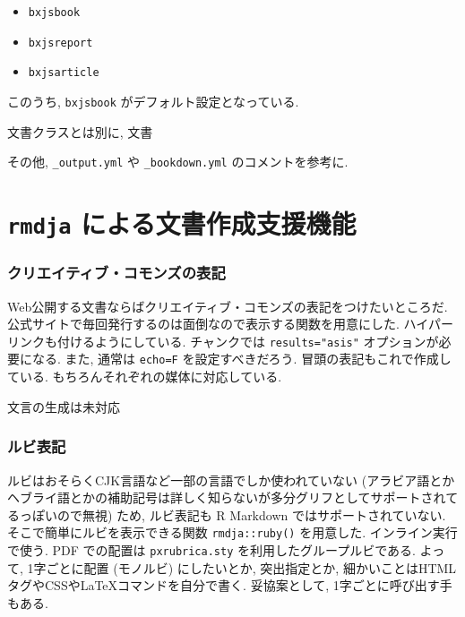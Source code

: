 \documentclass[
  nomag]{bxjsbook}
\providecommand{\tightlist}{%
  \setlength{\itemsep}{0pt}\setlength{\parskip}{0pt}}
\theoremstyle{definition}
\theoremstyle{definition}
\theoremstyle{definition}
\theoremstyle{remark}
\begin{document}
\begin{itemize}
\tightlist
\item
  \texttt{bxjsbook}
\item
  \texttt{bxjsreport}
\item
  \texttt{bxjsarticle}
\end{itemize}

このうち, \texttt{bxjsbook} がデフォルト設定となっている.

文書クラスとは別に, 文書

その他, \texttt{\_output.yml} や \texttt{\_bookdown.yml}
のコメントを参考に.

\hypertarget{rmdja-ux306bux3088ux308bux6587ux66f8ux4f5cux6210ux652fux63f4ux6a5fux80fd}{%
\chapter{\texorpdfstring{\texttt{rmdja}
による文書作成支援機能}{rmdja による文書作成支援機能}}\label{rmdja-ux306bux3088ux308bux6587ux66f8ux4f5cux6210ux652fux63f4ux6a5fux80fd}}

\hypertarget{ux30afux30eaux30a8ux30a4ux30c6ux30a3ux30d6ux30b3ux30e2ux30f3ux30baux306eux8868ux8a18}{%
\subsection{クリエイティブ・コモンズの表記}\label{ux30afux30eaux30a8ux30a4ux30c6ux30a3ux30d6ux30b3ux30e2ux30f3ux30baux306eux8868ux8a18}}

Web公開する文書ならばクリエイティブ・コモンズの表記をつけたいところだ.
公式サイトで毎回発行するのは面倒なので表示する関数を用意にした.
ハイパーリンクも付けるようにしている. チャンクでは
\texttt{results="asis"} オプションが必要になる. また, 通常は
\texttt{echo=F} を設定すべきだろう. 冒頭の表記もこれで作成している.
もちろんそれぞれの媒体に対応している.

文言の生成は未対応

\hypertarget{ux30ebux30d3ux8868ux8a18}{%
\subsection{ルビ表記}\label{ux30ebux30d3ux8868ux8a18}}

ルビはおそらくCJK言語など一部の言語でしか使われていない
(アラビア語とかヘブライ語とかの補助記号は詳しく知らないが多分グリフとしてサポートされてるっぽいので無視)
ため, ルビ表記も R Markdown ではサポートされていない.
そこで簡単にルビを表示できる関数 \texttt{rmdja::ruby()} を用意した.
インライン実行で使う. PDF での配置は \texttt{pxrubrica.sty}
を利用したグループルビである. よって, 1字ごとに配置 (モノルビ)
にしたいとか, 突出指定とか,
細かいことはHTMLタグやCSSやLaTeXコマンドを自分で書く. 妥協案として,
1字ごとに呼び出す手もある.
\end{document}
